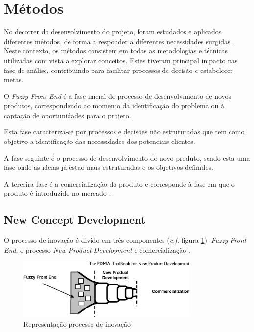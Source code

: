 \section{Métodos\label{section_metodos}}
No decorrer do desenvolvimento do projeto, foram estudados e aplicados diferentes métodos, de forma a responder a diferentes necessidades surgidas. Neste contexto, os métodos consistem em todas as metodologias e técnicas utilizadas com vista a explorar conceitos. Estes tiveram principal impacto nas fase de análise, contribuindo para facilitar processos de decisão e estabelecer metas.

O \emph{Fuzzy Front End} é a fase inicial do processo de desenvolvimento de novos produtos, correspondendo ao momento da identificação do problema ou à captação de oportunidades para o
projeto.

Esta fase caracteriza-se por processos e decisões não estruturadas que tem como objetivo a identificação das necessidades dos potenciais clientes.

A fase seguinte é o processo de  desenvolvimento do novo produto, sendo esta uma fase onde as ideias já estão mais estruturadas e os objetivos definidos. 

A terceira fase é a comercialização do produto e corresponde à fase em que o produto é introduzido no mercado \cite{fuzzy_frontend}.

\subsection{New Concept Development \label{subsection_new_concept_development}}
O processo de inovação é divido em três componentes (\emph{c.f.} figura \ref{figura_processo_inovacao}): \emph{Fuzzy
Front End}, o processo \emph{New Product Development} e comercialização \cite{fuzzy_frontend}.

\begin{figure}[H]
    \begin{center}
    \includegraphics[width=0.8\textwidth]{figures/new_product_development.png}
    \caption{Representação processo de inovação}
    \label{figura_processo_inovacao}
    \end{center}
\end{figure}

